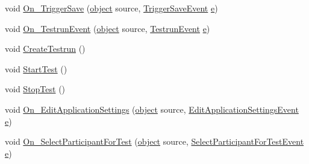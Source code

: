 \begin{DoxyCompactItemize}
\item 
void \hyperlink{class_web_analyzer_1_1_controller_1_1_main_controller_aadab56b24729cdfeeac6474825289c83}{On\+\_\+\+Trigger\+Save} (\hyperlink{_u_i_2_h_t_m_l_resources_2js_2lib_2underscore_8min_8js_aae18b7515bb2bc4137586506e7c0c903}{object} source, \hyperlink{class_web_analyzer_1_1_events_1_1_trigger_save_event}{Trigger\+Save\+Event} \hyperlink{_u_i_2_h_t_m_l_resources_2js_2lib_2bootstrap_8min_8js_ab5902775854a8b8440bcd25e0fe1c120}{e})
\item 
void \hyperlink{class_web_analyzer_1_1_controller_1_1_main_controller_a29b97f1032832f1a4600d6e00b038067}{On\+\_\+\+Testrun\+Event} (\hyperlink{_u_i_2_h_t_m_l_resources_2js_2lib_2underscore_8min_8js_aae18b7515bb2bc4137586506e7c0c903}{object} source, \hyperlink{class_web_analyzer_1_1_events_1_1_testrun_event}{Testrun\+Event} \hyperlink{_u_i_2_h_t_m_l_resources_2js_2lib_2bootstrap_8min_8js_ab5902775854a8b8440bcd25e0fe1c120}{e})
\item 
void \hyperlink{class_web_analyzer_1_1_controller_1_1_main_controller_a89558728bf22eec76ec4ff3ca0660490}{Create\+Testrun} ()
\item 
void \hyperlink{class_web_analyzer_1_1_controller_1_1_main_controller_a15dde2aa8b4f85e01fdfecf48483bbf8}{Start\+Test} ()
\item 
void \hyperlink{class_web_analyzer_1_1_controller_1_1_main_controller_ac75ad84f0191902e27a711efd325c648}{Stop\+Test} ()
\item 
void \hyperlink{class_web_analyzer_1_1_controller_1_1_main_controller_a0a28f10eb1aa2b814224a31a8a801054}{On\+\_\+\+Edit\+Application\+Settings} (\hyperlink{_u_i_2_h_t_m_l_resources_2js_2lib_2underscore_8min_8js_aae18b7515bb2bc4137586506e7c0c903}{object} source, \hyperlink{class_web_analyzer_1_1_events_1_1_edit_application_settings_event}{Edit\+Application\+Settings\+Event} \hyperlink{_u_i_2_h_t_m_l_resources_2js_2lib_2bootstrap_8min_8js_ab5902775854a8b8440bcd25e0fe1c120}{e})
\item 
void \hyperlink{class_web_analyzer_1_1_controller_1_1_main_controller_ae8eae4c1e6dda888f7231e39aaabba3c}{On\+\_\+\+Select\+Participant\+For\+Test} (\hyperlink{_u_i_2_h_t_m_l_resources_2js_2lib_2underscore_8min_8js_aae18b7515bb2bc4137586506e7c0c903}{object} source, \hyperlink{class_web_analyzer_1_1_events_1_1_select_participant_for_test_event}{Select\+Participant\+For\+Test\+Event} \hyperlink{_u_i_2_h_t_m_l_resources_2js_2lib_2bootstrap_8min_8js_ab5902775854a8b8440bcd25e0fe1c120}{e})
\end{DoxyCompactItemize}
